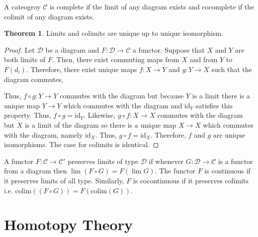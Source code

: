 \documentclass[12pt]{extarticle}
\newcommand{\colim}[1]{\mathrm{colim}(#1)}
\newcommand{\cat}[1]{\mathcal{#1}}
\newcommand{\id}{\mathrm{id}}
\theoremstyle{definition}
\newtheorem{theorem}{Theorem}[section]
\newenvironment{definition}[1][Definition:]{\begin{trivlist}
\item[\hskip \labelsep {\bfseries #1}]}{\end{trivlist}}
\begin{document}
\begin{definition}
A cateogroy $\cat{C}$ is complete if the limit of any diagram exists and cocomplete if the colimit of any diagram exists. 
\end{definition}

\begin{theorem}
Limits and colimits are unique up to unique isomorphism.
\end{theorem}

\begin{proof}
Let $\cat{D}$ be a diagram and $F : \cat{D} \to \cat{C}$ a functor. Suppose that $X$ and $Y$ are both limits of $F$. Then, there exist commuting maps from $X$ and from $Y$ to $F(d_i)$. Therefore, there exist unique maps $f : X \to Y$ and $g : Y \to X$ such that the diagram commutes, 
\begin{center}
\end{center}
Thus, $f \circ g : Y \to Y$ commutes with the diagram but because $Y$ is a limit there is a unique map $Y \to Y$ which commutes with the diagram and $\id_Y$ satisfies this property. Thus, $f \circ g = \id_Y$. Likewise, $g \circ f : X \to X$ commutes with the diagram but $X$ is a limit of the diagram so there is a unique map $X \to X$ which commutes with the diagram, namely $\id_X$. Thus, $g \circ f = \id_X$. Therefore, $f$ and $g$ are unique isomorphisms. The case for colimits is identical. 
\end{proof}

\begin{definition}
A functor $F : \cat{C} \to \cat{C}'$ preserves limits of type $\cat{D}$ if whenever $G : \cat{D} \to \cat{C}$ is a functor from a diagram then $\lim{(F \circ G)} = F(\lim{G})$. The functor $F$ is continuous if it preserves limits of all type. Similarly, $F$ is cocontinuous if it preserves colimits i.e. $\colim{(F \circ G)} = F(\colim{G})$. 
\end{definition}

\section{Homotopy Theory}
\end{document}
